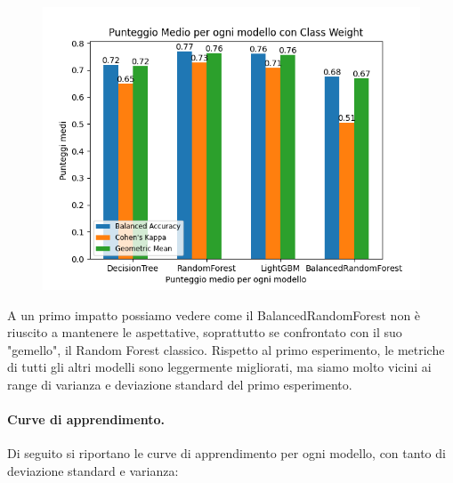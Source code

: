 \begin{figure}[H]
    \centering
    \includegraphics[scale=0.7]{img/cw_metrics.png}
\end{figure}

\noindent A un primo impatto possiamo vedere come il BalancedRandomForest non è riuscito a mantenere le aspettative, soprattutto se confrontato con il suo "gemello", il Random Forest classico. Rispetto al primo esperimento, le metriche di tutti gli altri modelli sono leggermente migliorati, ma siamo molto vicini ai range di varianza e deviazione standard del primo esperimento.\\

\paragraph{Curve di apprendimento.} Di seguito si riportano le curve di apprendimento per ogni modello, con tanto di deviazione standard e varianza:

